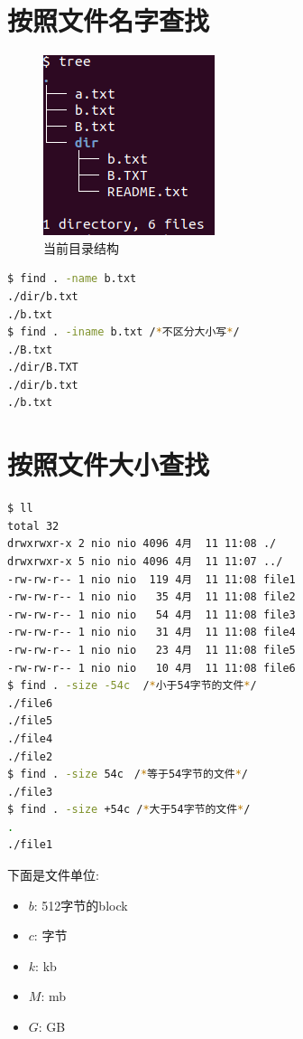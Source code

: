 \documentclass{article}
\begin{document}
\section{按照文件名字查找}
\begin{figure}[H]
	\centering
	\includegraphics[scale=0.8]{pic2.png} \par
	\caption{当前目录结构}
\end{figure}

\begin{lstlisting}[language=bash]
$ find . -name b.txt
./dir/b.txt
./b.txt
$ find . -iname b.txt /*不区分大小写*/
./B.txt
./dir/B.TXT
./dir/b.txt
./b.txt
\end{lstlisting}

\section{按照文件大小查找}

\begin{lstlisting}[language=bash]
$ ll
total 32
drwxrwxr-x 2 nio nio 4096 4月  11 11:08 ./
drwxrwxr-x 5 nio nio 4096 4月  11 11:07 ../
-rw-rw-r-- 1 nio nio  119 4月  11 11:08 file1
-rw-rw-r-- 1 nio nio   35 4月  11 11:08 file2
-rw-rw-r-- 1 nio nio   54 4月  11 11:08 file3
-rw-rw-r-- 1 nio nio   31 4月  11 11:08 file4
-rw-rw-r-- 1 nio nio   23 4月  11 11:08 file5
-rw-rw-r-- 1 nio nio   10 4月  11 11:08 file6
$ find . -size -54c  /*小于54字节的文件*/
./file6
./file5
./file4
./file2
$ find . -size 54c　/*等于54字节的文件*/
./file3
$ find . -size +54c /*大于54字节的文件*/
.
./file1
\end{lstlisting}
下面是文件单位: \par
\begin{itemize}
	\item $b$: 512字节的block
	\item $c$: 字节
	\item $k$: kb
	\item $M$: mb
	\item $G$: GB
\end{itemize}
\end{document}
